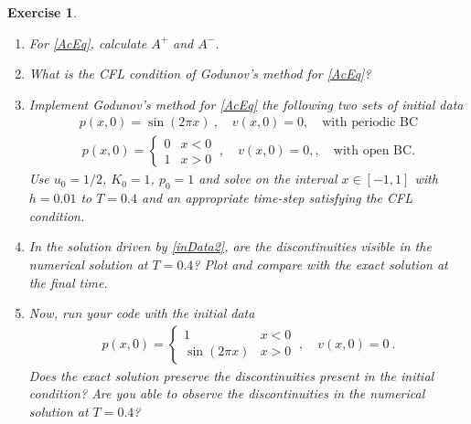 \documentclass[10pt,letterpaper]{article}
\newcommand{\frb}[1]{ \left(  {#1} \right) }
\theoremstyle{break}
\newtheorem{exercise}{Exercise}
\begin{document}
\begin{exercise}
	\begin{enumerate}

		\item
		For \eqref{AcEq}, calculate $A^{+}$ and $A^{-}$. 


		\item
		What is the CFL condition of Godunov's method for \eqref{AcEq}?


		\item
		Implement Godunov's method for \eqref{AcEq} the following two sets of initial data
		\begin{gather} \label{inData1}
			p(x,0)=\sin\frb{2\pi x}\ ,
			\quad
			v(x,0)=0, \quad \text{with periodic BC}
		\end{gather}%
		\begin{gather} \label{inData2}
			p(x,0)=\begin{cases}
				0 & x<0\\
				1 & x>0
			\end{cases}\ ,
			\quad
			v(x,0)=0, , \quad \text{with open BC}.
		\end{gather}%
		Use $u_{0}=1/2$, $K_{0}=1$, $p_{0}=1$ and solve on the interval
		$x\in\left[-1,1\right]$ with $h=0.01$ to $T=0.4$ and an appropriate
		time-step satisfying the CFL condition.

		\item
		In the solution driven by \eqref{inData2}, are the discontinuities visible in the numerical solution at $T=0.4$? Plot and compare with the exact solution at the final time.

		\item
		Now, run your code with the initial data
		\begin{gather} \label{inData3}
			p(x,0)=\begin{cases}
				1 & x<0\\
				\sin\frb{2\pi x} & x>0
			\end{cases}\ ,
			\quad
			v(x,0)=0\ .
		\end{gather}%
		Does the exact solution preserve the discontinuities present in the initial condition? Are you able to observe the discontinuities in the numerical solution at $T=0.4$?





\end{enumerate}
\end{exercise}
\end{document}
